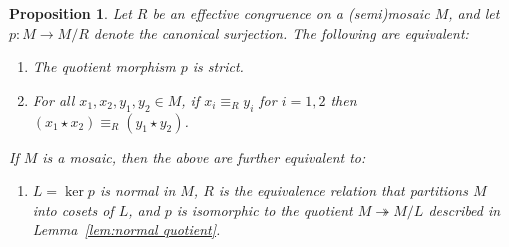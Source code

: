 \documentclass[reqno]{amsart}
\numberwithin{equation}{section}
\theoremstyle{plain}
\newtheorem{proposition}[equation]{Proposition}
\theoremstyle{definition}
\begin{document}
\begin{proposition}\label{prop:strict epi}
Let $R$ be an effective congruence on a (semi)mosaic $M$, and let $p \colon M \to M/R$ denote the canonical surjection. The following are equivalent:
\begin{enumerate}
\item The quotient morphism $p$ is strict.
\item For all $x_1, x_2, y_1, y_2 \in M$, if $x_i \equiv_R y_i$ for $i = 1,2$ then $(x_1 \star x_2) \equiv_R (y_1 \star y_2)$.
\end{enumerate}
If $M$ is a mosaic, then the above are further equivalent to:
\begin{enumerate}[resume]
\item $L = \ker p$ is normal in $M$, $R$ is the equivalence relation that partitions $M$ into cosets of $L$, and $p$ is isomorphic to the quotient $M \twoheadrightarrow M/L$ described in Lemma~\ref{lem:normal quotient}.
\end{enumerate}
\end{proposition}
\end{document}
